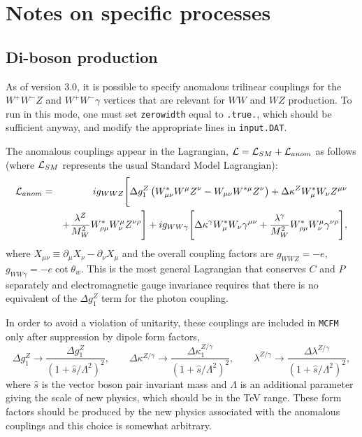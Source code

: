 \documentclass[12pt]{article}
\begin{document}
\section{Notes on specific processes}
\label{sec:specific}

\subsection{Di-boson production}
\label{subsec:diboson}

As of version 3.0, it is possible to specify anomalous trilinear
couplings for the $W^+W^-Z$ and $W^+W^-\gamma$ vertices that are
relevant for $WW$ and $WZ$ production. To run in this mode, one
must set {\tt zerowidth} equal to {\tt .true.}, which should be
sufficient anyway, and modify the appropriate lines in {\tt input.DAT}.

The anomalous couplings appear in the Lagrangian,
${\cal L} = {\cal L}_{SM} + {\cal L}_{anom}$ as follows
(where ${\cal L}_{SM}$ represents the usual Standard Model Lagrangian):
\begin{eqnarray}
{\cal L}_{anom} & = & i g_{WWZ} \Biggl[
 \Delta g_1^Z \left( W^*_{\mu\nu}W^\mu Z^\nu - W_{\mu\nu}W^{*\mu} Z^\nu \right)
+\Delta\kappa^Z W^*_\mu W_\nu Z^{\mu\nu} \nonumber \\
 & &+
 \frac{\lambda^Z}{M_W^2} W^*_{\rho\mu} W^\mu_\nu Z^{\nu\rho} \Biggr]
+i g_{WW\gamma} \Biggl[ 
 \Delta\kappa^\gamma W^*_\mu W_\nu \gamma^{\mu\nu}
+\frac{\lambda^\gamma}{M_W^2} W^*_{\rho\mu} W^\mu_\nu\gamma^{\nu\rho}
 \Biggr], \nonumber
\end{eqnarray}
where $X_{\mu\nu} \equiv \partial_\mu X_{\nu} - \partial_\nu X_{\mu}$
and the overall coupling factors are $g_{WWZ}=-e$,
$g_{WW\gamma}=-e\cot\theta_w$.
This is the most general Lagrangian that conserves $C$ and $P$
separately and electromagnetic gauge invariance requires that there
is no equivalent of the $\Delta g_1^Z$ term for the photon coupling.

In order to avoid a violation of unitarity, these couplings are included
in {\tt MCFM} only after suppression by dipole form factors,
\begin{displaymath}
\Delta g_1^Z \rightarrow \frac{\Delta g_1^Z}{(1+\hat{s}/\Lambda^2)^2}, \qquad
\Delta \kappa^{Z/\gamma} \rightarrow
 \frac{\Delta \kappa_1^{Z/\gamma}}{(1+\hat{s}/\Lambda^2)^2}, \qquad
\lambda^{Z/\gamma} \rightarrow
 \frac{\Delta \lambda^{Z/\gamma}}{(1+\hat{s}/\Lambda^2)^2},
\end{displaymath}
where $\hat{s}$ is the vector boson pair invariant mass and $\Lambda$
is an additional parameter giving the scale of new physics, which should
be in the TeV range.
These form factors should be produced by the new physics associated with the
anomalous couplings and this choice is somewhat arbitrary.
\end{document}
